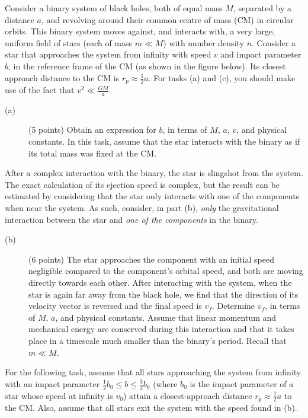 Consider a binary system of black holes, both of equal mass $M$, separated by
a distance $a$, and revolving around their common centre of mass (CM) in
circular orbits. This binary system moves against, and interacts with, a very
large, uniform field of stars (each of mass $m \ll M$) with number density
$n$. Consider a star that approaches the system from infinity with speed $v$
and impact parameter $b$, in the reference frame of the CM (as shown in the
figure below). Its closest approach distance to the CM is
$r_p \approx \frac{1}{2}a$. For tasks (a) and (c), you should make use of the
fact that $v^2 \ll \frac{GM}{a}$.

\begin{description}
\item[(a)] (5 points) Obtain an expression for $b$, in terms of $M$, $a$,
  $v$, and physical constants. In this task, assume that the star interacts
  with the binary as if its total mass was fixed at the CM.
\end{description}

After a complex interaction with the binary, the star is slingshot from the
system. The exact calculation of its ejection speed is complex, but the
result can be estimated by considering that the star only interacts with one
of the components when near the system. As such, consider, in part (b),
\emph{only} the gravitational interaction between the star and \emph{one of
the components} in the binary.

\begin{description}
\item[(b)] (6 points) The star approaches the component with an initial
  speed negligible compared to the component's orbital speed, and both are
  moving directly towards each other. After interacting with the system,
  when the star is again far away from the black hole, we find that the
  direction of its velocity vector is reversed and the final speed is
  $v_f$. Determine $v_f$, in terms of $M$, $a$, and physical constants.
  Assume that linear momentum and mechanical energy are conserved during
  this interaction and that it takes place in a timescale much smaller than
  the binary's period. Recall that $m \ll M$.
\end{description}

For the following task, assume that all stars approaching the system from
infinity with an impact parameter $\frac{1}{2}b_0 \le b \le \frac{3}{2}b_0$
(where $b_0$ is the impact parameter of a star whose speed at infinity is
$v_0$) attain a closest-approach distance $r_p \approx \frac{1}{2}a$ to the
CM. Also, assume that all stars exit the system with the speed found in (b).

